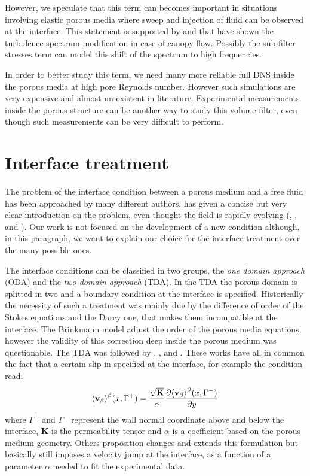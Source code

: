 However, we speculate that this term can becomes important in situations involving elastic porous media where sweep and injection of fluid can be observed at the interface.
This statement is supported by \citet{finnigan2000turbulence} and \citet{de2008effects} that have shown the turbulence spectrum modification in case of canopy flow. Possibly the sub-filter stresses term can model this shift of the spectrum to high frequencies.

In order to better study this term, we need many more reliable full DNS inside the porous media at high pore Reynolds number. However such simulations are very expensive and almost un-existent in literature.
Experimental measurements inside the porous structure can be another way to study this volume filter, even though such measurements can be very difficult to perform.

\section{Interface treatment}
\label{ch:interface}

The problem of the interface condition between a porous medium and a free fluid has been approached by many different authors. \citet{ehrhardt2010interface} has given a concise but very clear introduction on the problem, even thought the field is rapidly evolving (\citet{minale2014momentum}, \citet{angot2017asymptotic}, \citet{lacis2017framework} and ).
Our work is not focused on the development of a new condition although, in this paragraph, we want to explain our choice for the interface treatment over the many possible ones.

The interface conditions can be classified in two groups, the \textit{one domain approach} (ODA) and the \textit{two domain approach} (TDA).
In the TDA the porous domain is splitted in two and a boundary condition at the interface is specified. Historically the necessity of such a treatment was mainly due by the difference of order of the Stokes equations and the Darcy one, that makes them incompatible at the interface.
The Brinkmann model adjust the order of the porous media equations, however the validity of this correction deep inside the porous medium was questionable.
The TDA was followed by \citet{beavers1967boundary}, \citet{mikelic2000interface}, \citet{ochoa1995momentum} and \citet{le2006interfacial}.
These works have all in common the fact that a certain slip in specified at the interface, for example the \citet{beavers1967boundary} condition read:
$$
{\left< \textbf{v}_{\beta} \right>}^{\beta}(x,\Gamma^+) = \dfrac{\sqrt{\mathbf{K}}}{\alpha} \dfrac{\partial {\left< \textbf{v}_{\beta}\right>}^{\beta}(x, \Gamma^-)}{\partial y}
$$
where $\Gamma^+$ and $\Gamma^-$ represent the wall normal coordinate above and below the interface, $\mathbf{K}$ is the permeability tensor and $\alpha$ is a coefficient based on the porous medium geometry.
Others proposition changes and extends this formulation but basically still imposes a velocity jump at the interface, as a function of a parameter $\alpha$ needed to fit the experimental data.

